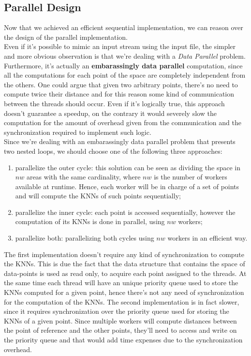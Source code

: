 \documentclass[12pt, letterpaper]{article}  %
\begin{document}
\subsection{Parallel Design}
Now that we achieved an efficient sequential implementation, we can reason over the design of the parallel implementation.\\
Even if it's possible to mimic an input stream using the input file, the simpler and more obvious observation is that we're dealing with a \textit{Data Parallel} problem. Furthermore, it's actually an \textbf{embarassingly data parallel} computation, since all the computations for each point of the space are completely independent from the others. One could argue that given two arbitrary points, there's no need to compute twice their distance and for this reason some kind of communication between the threads should occur. Even if it's logically true, this approach doesn't guarantee a speedup, on the contrary it would severely slow the computation for the amount of overhead given from the communication and the synchronization required to implement such logic.\\
Since we're dealing with an embarassingly data parallel problem that presents two nested loops, we should choose one of the following three approaches:
\begin{enumerate}
    \item parallelize the outer cycle: this solution can be seen as dividing the space in $nw$ areas with the same cardinality, where $nw$ is the number of workers available at runtime. Hence, each worker will be in charge of a set of points and will compute the KNNs of such points sequentially;
    \item parallelize the inner cycle: each point is accessed sequentially, however the computation of its KNNs is done in parallel, using $nw$ workers;
    \item parallelize both: parallelizing both cycles using $nw$ workers in an efficient way.
\end{enumerate}
The first implementation doesn't require any kind of synchronization to compute the KNNs. This is due the fact that the data structure that contains the space of data-points is used as read only, to acquire each point assigned to the threads. At the same time each thread will have an unique priority queue used to store the KNNs computed for a given point, hence there's not any need of synchronization for the computation of the KNNs. 
The second implementation is in fact slower, since it requires synchronization over the priority queue used for storing the KNNs of a given point. Since multiple workers will compute distances between the point of reference and the other points, they'll need to access and write on the priority queue and that would add time expenses due to the synchronization overhead.
\end{document}
